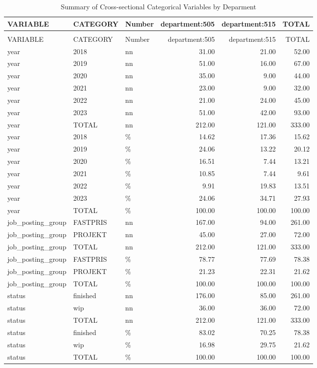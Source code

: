 \begingroup\fontsize{9}{11}\selectfont

\begin{longtable}[t]{lllrrr}
\caption{Summary of Cross-sectional Categorical Variables by Deparment}\\
\toprule
VARIABLE & CATEGORY & Number & department:505 & department:515 & TOTAL\\
\midrule
\endfirsthead
\caption[]{Summary of Cross-sectional Categorical Variables by Deparment }\\
\toprule
VARIABLE & CATEGORY & Number & department:505 & department:515 & TOTAL\\
\midrule
\endhead

\endfoot
\bottomrule
\endlastfoot
year & 2018 & nn & 31.00 & 21.00 & 52.00\\
year & 2019 & nn & 51.00 & 16.00 & 67.00\\
year & 2020 & nn & 35.00 & 9.00 & 44.00\\
year & 2021 & nn & 23.00 & 9.00 & 32.00\\
year & 2022 & nn & 21.00 & 24.00 & 45.00\\
year & 2023 & nn & 51.00 & 42.00 & 93.00\\
year & TOTAL & nn & 212.00 & 121.00 & 333.00\\
year & 2018 & \% & 14.62 & 17.36 & 15.62\\
year & 2019 & \% & 24.06 & 13.22 & 20.12\\
year & 2020 & \% & 16.51 & 7.44 & 13.21\\
year & 2021 & \% & 10.85 & 7.44 & 9.61\\
year & 2022 & \% & 9.91 & 19.83 & 13.51\\
year & 2023 & \% & 24.06 & 34.71 & 27.93\\
year & TOTAL & \% & 100.00 & 100.00 & 100.00\\
job\_posting\_group & FASTPRIS & nn & 167.00 & 94.00 & 261.00\\
job\_posting\_group & PROJEKT & nn & 45.00 & 27.00 & 72.00\\
job\_posting\_group & TOTAL & nn & 212.00 & 121.00 & 333.00\\
job\_posting\_group & FASTPRIS & \% & 78.77 & 77.69 & 78.38\\
job\_posting\_group & PROJEKT & \% & 21.23 & 22.31 & 21.62\\
job\_posting\_group & TOTAL & \% & 100.00 & 100.00 & 100.00\\
status & finished & nn & 176.00 & 85.00 & 261.00\\
status & wip & nn & 36.00 & 36.00 & 72.00\\
status & TOTAL & nn & 212.00 & 121.00 & 333.00\\
status & finished & \% & 83.02 & 70.25 & 78.38\\
status & wip & \% & 16.98 & 29.75 & 21.62\\
status & TOTAL & \% & 100.00 & 100.00 & 100.00\\*
\end{longtable}
\endgroup{}

